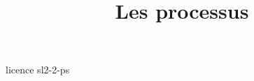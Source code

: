 \documentclass [xcolor=table] {beamer}
\title {Les processus}
\begin{document}
 {licence}
 {sl2-2-ps}
\end{document}
